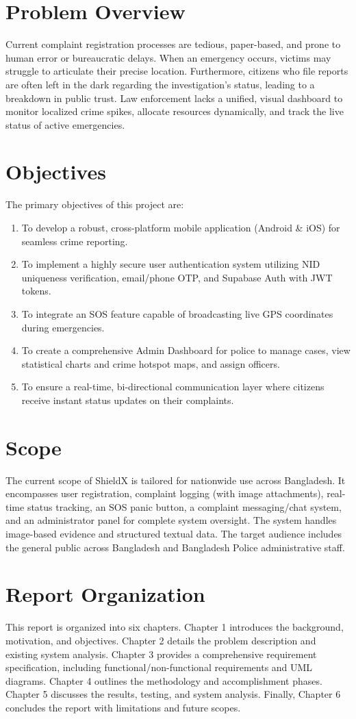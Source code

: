 \documentclass[12pt, a4paper, twoside, openany]{report}
\begin{document}
\section{Problem Overview}
Current complaint registration processes are tedious, paper-based, and prone to human error or bureaucratic delays. When an emergency occurs, victims may struggle to articulate their precise location. Furthermore, citizens who file reports are often left in the dark regarding the investigation's status, leading to a breakdown in public trust. Law enforcement lacks a unified, visual dashboard to monitor localized crime spikes, allocate resources dynamically, and track the live status of active emergencies.
\section{Objectives}
The primary objectives of this project are:
\begin{enumerate}
    \item To develop a robust, cross-platform mobile application (Android \& iOS) for seamless crime reporting.
    \item To implement a highly secure user authentication system utilizing NID uniqueness verification, email/phone OTP, and Supabase Auth with JWT tokens.
    \item To integrate an SOS feature capable of broadcasting live GPS coordinates during emergencies.
    \item To create a comprehensive Admin Dashboard for police to manage cases, view statistical charts and crime hotspot maps, and assign officers.
    \item To ensure a real-time, bi-directional communication layer where citizens receive instant status updates on their complaints.
\end{enumerate}
\section{Scope}
The current scope of ShieldX is tailored for nationwide use across Bangladesh. It encompasses user registration, complaint logging (with image attachments), real-time status tracking, an SOS panic button, a complaint messaging/chat system, and an administrator panel for complete system oversight. The system handles image-based evidence and structured textual data. The target audience includes the general public across Bangladesh and Bangladesh Police administrative staff.
\section{Report Organization}
This report is organized into six chapters. Chapter 1 introduces the background, motivation, and objectives. Chapter 2 details the problem description and existing system analysis. Chapter 3 provides a comprehensive requirement specification, including functional/non-functional requirements and UML diagrams. Chapter 4 outlines the methodology and accomplishment phases. Chapter 5 discusses the results, testing, and system analysis. Finally, Chapter 6 concludes the report with limitations and future scopes.
\end{document}
